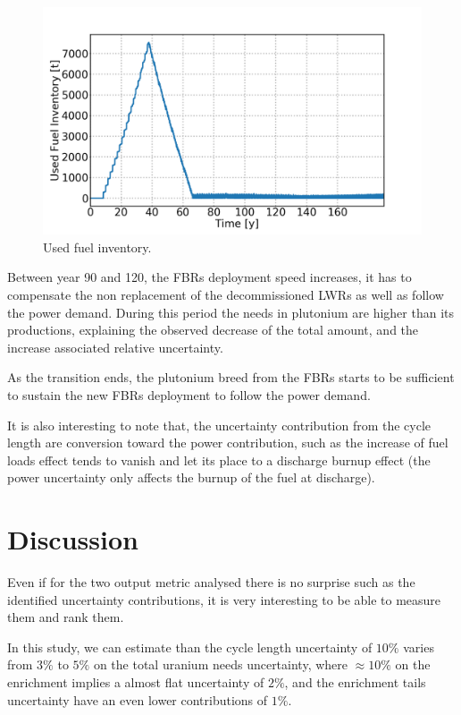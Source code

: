 \documentclass{anstrans}
\begin{document}
\begin{figure}[ht] %
    \centering
    \includegraphics[scale=0.17]{used_fuel}
    \caption{Used fuel inventory.}\label{fig:used_fuel}
\end{figure}
Between year 90 and 120, the \glspl{FBR} deployment speed increases, it has to
compensate the non replacement of the decommissioned \glspl{LWR} as well as
follow the power demand. During this period the needs in plutonium are higher
than its productions, explaining the observed decrease of the total amount, and
the increase associated relative uncertainty.

As the transition ends, the plutonium breed from the \glspl{FBR} starts to be
sufficient to sustain the new \glspl{FBR} deployment to follow the power demand.

It is also interesting to note that, the uncertainty contribution from the cycle
length are conversion toward the power contribution, such as the increase of
fuel loads effect tends to vanish and let its place to a discharge burnup
effect (the power uncertainty only affects the burnup of the fuel at discharge).

\section{Discussion}

Even if for the two output metric analysed there is no surprise such as the
identified uncertainty contributions, it is very interesting to be able to
measure them and rank them.

In this study, we can estimate than the cycle length uncertainty of $10\%$
varies from $3\%$ to $5\%$ on the total uranium needs uncertainty, where $\approx10\%$
on the enrichment implies a almost flat uncertainty of $2\%$, and the enrichment
tails uncertainty have an even lower contributions of $1\%$.
\end{document}
